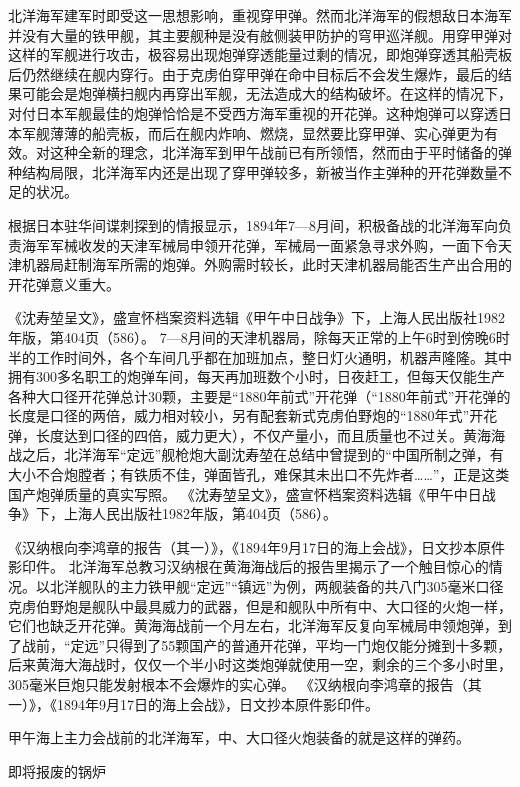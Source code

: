 \documentclass[12pt,UTF8]{ctexbook}
\begin{document}
北洋海军建军时即受这一思想影响，重视穿甲弹。然而北洋海军的假想敌日本海军并没有大量的铁甲舰，其主要舰种是没有舷侧装甲防护的穹甲巡洋舰。用穿甲弹对这样的军舰进行攻击，极容易出现炮弹穿透能量过剩的情况，即炮弹穿透其船壳板后仍然继续在舰内穿行。由于克虏伯穿甲弹在命中目标后不会发生爆炸，最后的结果可能会是炮弹横扫舰内再穿出军舰，无法造成大的结构破坏。在这样的情况下，对付日本军舰最佳的炮弹恰恰是不受西方海军重视的开花弹。这种炮弹可以穿透日本军舰薄薄的船壳板，而后在舰内炸响、燃烧，显然要比穿甲弹、实心弹更为有效。对这种全新的理念，北洋海军到甲午战前已有所领悟，然而由于平时储备的弹种结构局限，北洋海军内还是出现了穿甲弹较多，新被当作主弹种的开花弹数量不足的状况。

根据日本驻华间谍刺探到的情报显示，1894年7—8月间，积极备战的北洋海军向负责海军军械收发的天津军械局申领开花弹，军械局一面紧急寻求外购，一面下令天津机器局赶制海军所需的炮弹。外购需时较长，此时天津机器局能否生产出合用的开花弹意义重大。

《沈寿堃呈文》，盛宣怀档案资料选辑《甲午中日战争》下，上海人民出版社1982年版，第404页（586）。
7—8月间的天津机器局，除每天正常的上午6时到傍晚6时半的工作时间外，各个车间几乎都在加班加点，整日灯火通明，机器声隆隆。其中拥有300多名职工的炮弹车间，每天再加班数个小时，日夜赶工，但每天仅能生产各种大口径开花弹总计30颗，主要是“1880年前式”开花弹（“1880年前式”开花弹的长度是口径的两倍，威力相对较小，另有配套新式克虏伯野炮的“1880年式”开花弹，长度达到口径的四倍，威力更大），不仅产量小，而且质量也不过关。黄海海战之后，北洋海军“定远”舰枪炮大副沈寿堃在总结中曾提到的“中国所制之弹，有大小不合炮膛者；有铁质不佳，弹面皆孔，难保其未出口不先炸者……”，正是这类国产炮弹质量的真实写照。 《沈寿堃呈文》，盛宣怀档案资料选辑《甲午中日战争》下，上海人民出版社1982年版，第404页（586）。

《汉纳根向李鸿章的报告（其一）》，《1894年9月17日的海上会战》，日文抄本原件影印件。
北洋海军总教习汉纳根在黄海海战后的报告里揭示了一个触目惊心的情况。以北洋舰队的主力铁甲舰“定远”“镇远”为例，两舰装备的共八门305毫米口径克虏伯野炮是舰队中最具威力的武器，但是和舰队中所有中、大口径的火炮一样，它们也缺乏开花弹。黄海海战前一个月左右，北洋海军反复向军械局申领炮弹，到了战前，“定远”只得到了55颗国产的普通开花弹，平均一门炮仅能分摊到十多颗，后来黄海大海战时，仅仅一个半小时这类炮弹就使用一空，剩余的三个多小时里，305毫米巨炮只能发射根本不会爆炸的实心弹。 《汉纳根向李鸿章的报告（其一）》，《1894年9月17日的海上会战》，日文抄本原件影印件。

甲午海上主力会战前的北洋海军，中、大口径火炮装备的就是这样的弹药。

即将报废的锅炉
\end{document}
